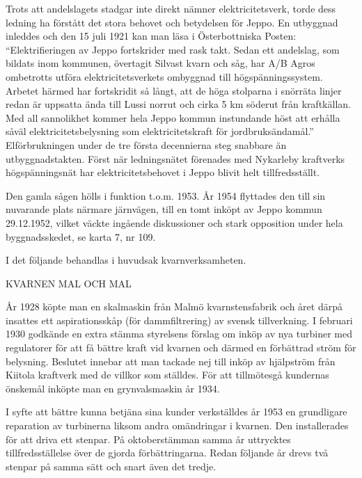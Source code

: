 Trots att andelslagets stadgar inte direkt nämner elektricitetsverk, torde dess ledning ha förstått det stora behovet och betydelsen för Jeppo. En utbyggnad inleddes och den 15 juli 1921 kan man läsa i Österbottniska Posten: ``Elektrifieringen av Jeppo fortskrider med rask takt. Sedan ett andelslag, som bildats inom kommunen, övertagit Silvast kvarn och såg, har A/B Agros ombetrotts utföra elektricitetsverkets ombyggnad till högspänningssystem. Arbetet härmed har fortskridit så långt, att de höga stolparna i snörräta linjer redan är uppsatta ända till Lussi norrut och cirka 5 km söderut från kraftkällan. Med all sannolikhet kommer hela Jeppo kommun instundande höst att erhålla såväl elektricitetsbelysning som elektricitetskraft för jordbruksändamål.''  Elförbrukningen under de tre första decennierna steg snabbare än utbyggnadstakten. Först när ledningsnätet förenades med Nykarleby kraftverks högspänningsnät har elektricitetsbehovet i Jeppo blivit helt tillfredsställt.

Den gamla sågen hölls i funktion t.o.m. 1953. År 1954 flyttades den till sin nuvarande plats närmare järnvägen, till en tomt inköpt av Jeppo kommun 29.12.1952, vilket väckte ingående diskussioner och stark opposition under hela byggnadsskedet, se karta 7, nr 109.

I det följande behandlas i huvudsak kvarnverksamheten.




KVARNEN MAL OCH MAL

År 1928 köpte man en skalmaskin från Malmö kvarnstensfabrik och året därpå insattes ett aspirationsskåp (för dammfiltrering) av svensk tillverkning. I februari 1930 godkände en extra stämma styrelsens förslag om inköp av nya turbiner med regulatorer för att få bättre kraft vid kvarnen och därmed en förbättrad ström för belysning. Beslutet innebar att man tackade nej till inköp av hjälpström från Kiitola kraftverk med de villkor som ställdes. För att tillmötesgå kundernas önskemål inköpte man en grynvalsmaskin år 1934.

I syfte att bättre kunna betjäna sina kunder verkställdes år 1953 en grundligare reparation av turbinerna liksom andra omändringar i kvarnen. Den  installerades för att driva ett stenpar. På oktoberstämman samma år uttrycktes tillfredsställelse över de gjorda förbättringarna. Redan följande år drevs två stenpar på samma sätt och snart även det tredje.

